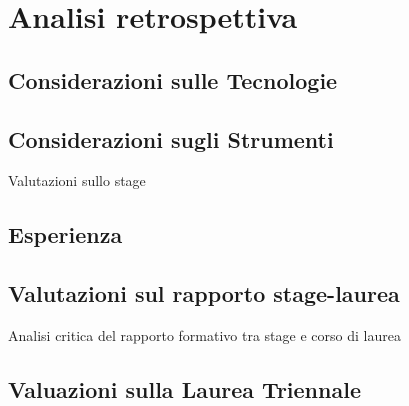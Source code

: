 
\chapter{Analisi retrospettiva} %
\label{cap:valutazione}


\section{Considerazioni sulle Tecnologie}

\section{Considerazioni sugli Strumenti}

Valutazioni sullo stage

\section{Esperienza}

\section{Valutazioni sul rapporto stage-laurea}
Analisi critica del rapporto formativo tra stage e corso di laurea

\section{Valuazioni sulla Laurea Triennale}
